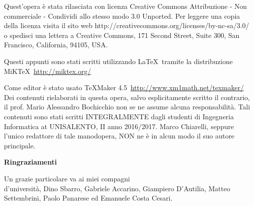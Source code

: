 \documentclass[11 pt,a4paper,twoside,openany]{book}
\begin{document}

\newpage
\null{}\null

\newpage
Quest'opera è stata rilasciata con licenza Creative Commons Attribuzione - Non commerciale - Condividi allo stesso modo 3.0 Unported. Per leggere una copia della licenza visita il sito web http://creativecommons.org/licenses/by-nc-sa/3.0/ o spedisci una lettera a Creative Commons, 171 Second Street, Suite 300, San Francisco, California, 94105, USA.\par \ccbyncsaeu
	\vfill
	Questi appunti sono stati scritti utilizzando \LaTeX\ tramite la distribuzione MiKTeX\ \url{http://miktex.org/}  
	
	Come editor è stato usato TeXMaker 4.5\ \url{http://www.xm1math.net/texmaker/}
	\vfill
	Dei contenuti rielaborati in questa opera, salvo esplicitamente scritto il contrario, il prof. Mario Alessandro Bochicchio non se ne assume alcuna responsabilità. 
	\vfill
	Tali contenuti sono stati scritti INTEGRALMENTE dagli studenti di Ingegneria Informatica at UNISALENTO, II anno 2016/2017. Marco Chiarelli, seppure l'unico redattore di tale manodopera, NON ne è in alcun modo il suo autore principale.

\null{}\null

\thispagestyle{fancy}
\fancyhead{}
\fancyfoot{}
\fancyfoot[C]{\thepage}
\vspace{2cm}


\noindent
{}
\tableofcontents

\frontmatter

\cleardoublepage\thispagestyle{empty}
\vspace*{\fill}
\begin{center}
\bfseries Ringraziamenti
\end{center}
\bigskip

Un grazie particolare va ai miei compagni\\
d'università, Dino Sbarro, Gabriele Accarino, Giampiero D'Autilia, Matteo Settembrini, Paolo Panarese ed Emanuele Costa Cesari.

\vspace*{\fill}
\pagebreak


\end{document}
